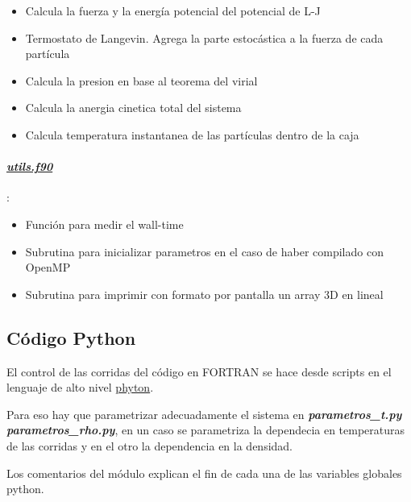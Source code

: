 \begin{itemize}
	\item Calcula la fuerza y la energía potencial del potencial de L-J

	\item Termostato de Langevin. Agrega la parte estocástica a la fuerza de cada partícula

	\item Calcula la presion en base al teorema del virial 

	\item Calcula la anergia cinetica total del sistema

	\item Calcula temperatura instantanea de las partículas dentro de la caja 
\end{itemize}

\paragraph{\underline{\textit{utils.f90}}}:

\begin{itemize}
   \item Función para medir el wall-time

 \item   Subrutina para inicializar parametros en el caso de haber compilado con OpenMP

 \item   Subrutina para imprimir con formato por pantalla un array 3D en lineal 

\end{itemize}


\subsection{Código Python}

El control de las corridas del código en FORTRAN se hace desde scripts en el lenguaje
de alto nivel  \href{http://www.python.org/}{phyton}. 

Para eso hay que parametrizar adecuadamente el sistema en \textbf{\textit{parametros\_t.py}}
\textbf{\textit{parametros\_rho.py}}, en un caso se parametriza la dependecia en temperaturas
de las corridas y en el otro la dependencia en la densidad.
 
Los comentarios del módulo explican el fin de cada una de las variables globales python.

